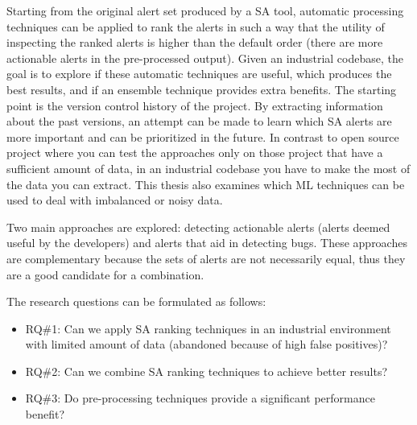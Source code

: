 Starting from the original alert set produced by a SA tool, automatic processing techniques can be applied to rank the alerts in such a way that the utility of inspecting the ranked alerts is higher than the default order (there are more actionable alerts in the pre-processed output). Given an industrial codebase, the goal is to explore if these automatic techniques are useful, which produces the best results, and if an ensemble technique provides extra benefits. The starting point is the version control history of the project. By extracting information about the past versions, an attempt can be made to learn which SA alerts are more important and can be prioritized in the future. In contrast to open source project where you can test the approaches only on those project that have a sufficient amount of data, in an industrial codebase you have to make the most of the data you can extract. This thesis also examines which ML techniques can be used to deal with imbalanced or noisy data.


Two main approaches are explored: detecting actionable alerts (alerts deemed useful by the developers) and alerts that aid in detecting bugs. These approaches are complementary because the sets of alerts are not necessarily equal, thus they are a good candidate for a combination.

The research questions can be formulated as follows:
\begin{itemize}
    \item RQ\#1: Can we apply SA ranking techniques in an industrial environment with limited amount of data (abandoned because of high false positives)?
    \item RQ\#2: Can we combine SA ranking techniques to achieve better results?
    \item RQ\#3: Do pre-processing techniques provide a significant performance benefit?
\end{itemize}


